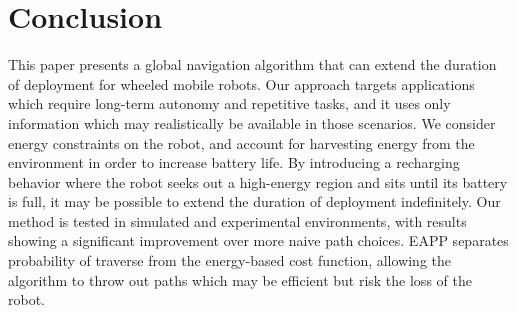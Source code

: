 \documentclass[journal]{IEEEtran}
\newcounter{row}
\begin{document}
\section{Conclusion}
This paper presents a global navigation algorithm that can extend the duration of deployment for wheeled mobile robots.
Our approach targets applications which require long-term autonomy and repetitive tasks, and it uses only information which may realistically be available in those scenarios.
We consider energy constraints on the robot, and account for harvesting energy from the environment in order to increase battery life. 
By introducing a recharging behavior where the robot seeks out a high-energy region and sits until its battery is full, it may be possible to extend the duration of deployment indefinitely.
Our method is tested in simulated and experimental environments, with results showing a significant improvement over more naive path choices.
EAPP separates probability of traverse from the energy-based cost function, allowing the algorithm to throw out paths which may be efficient but risk the loss of the robot.  






%


\end{document}
